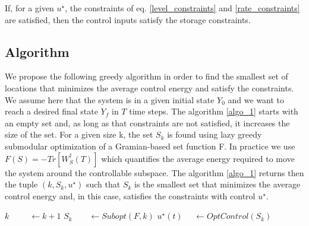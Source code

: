 \documentclass[conference]{IEEEtran}
\begin{document}
If, for a given $ u^{\star} $, the constraints of eq. \ref{level_constraints} and \ref{rate_constraints} are satisfied, then the control inputs satisfy the storage constraints.

\subsection{Algorithm}

We propose the following greedy algorithm in order to find the smallest set of locations that minimizes the average control energy and satisfy the constraints. We assume here that the system is in a given initial state $ Y_0 $ and we want to reach a desired final state $ Y_f$  in $ T $ time steps. The algorithm \ref{algo_1} starts with an empty set and, as long as that constraints are not satisfied, it increases the size of the set. For a given size k, the set $ S_k $ is found using lazy greedy submodular optimization of a Gramian-based set function F. In practice we use $ F(S) = -Tr \left[ W_S^{\dagger}(T) \right] $ which quantifies the average energy required to move the system around the controllable subspace. The algorithm \ref{algo_1} returns then the tuple $ (k,S_k,u^{\star}) $ such that $ S_k $ is the smallest set that minimizes the average control energy and, in this case, satisfies the constraints with control $u^{\star}$. 

\begin{algorithm}
	\label{algo_1}

        \begin{algorithmic}
    \State $k\ \ \ \ \ \ \ \ \ \ \ \gets k+1$
    \State $ S_k \ \ \ \ \ \ \ \ \ \gets Subopt(F, k)$
    \State $ u^{\star}(t)\ \ \ \ \ \ \gets OptControl( S_{k} )$ 
\EndWhile
        \end{algorithmic}
\end{algorithm}
\normalsize
\end{document}
